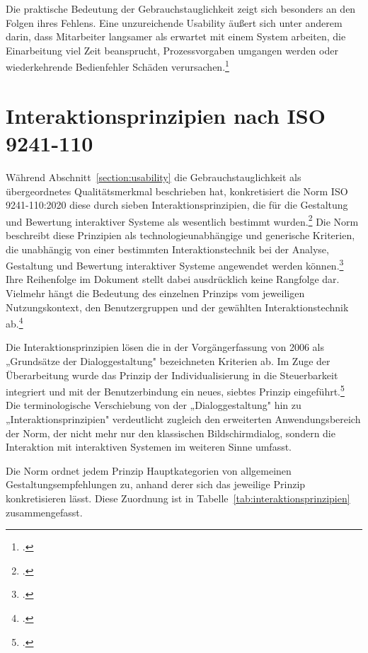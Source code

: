 Die praktische Bedeutung der Gebrauchstauglichkeit zeigt sich besonders an den Folgen ihres Fehlens. Eine unzureichende Usability äußert
sich unter anderem darin, dass Mitarbeiter langsamer als erwartet mit einem System arbeiten, die Einarbeitung viel Zeit beansprucht, 
Prozessvorgaben umgangen werden oder wiederkehrende Bedienfehler Schäden verursachen.\footcite[Vgl.][S. 7]{richter_2010}


\section{Interaktionsprinzipien nach ISO 9241-110}
\label{grundsaetzeISO}

Während Abschnitt~\ref{section:usability} die Gebrauchstauglichkeit als übergeordnetes Qualitätsmerkmal beschrieben hat, konkretisiert die 
Norm ISO 9241-110:2020 diese durch sieben Interaktionsprinzipien, die für die Gestaltung und Bewertung interaktiver Systeme als wesentlich 
bestimmt wurden.\footcite[Vgl.][Abschnitt 4.1]{DIN_ISO_9241-110:2020} Die Norm beschreibt diese Prinzipien als technologieunabhängige 
und generische Kriterien, die unabhängig von einer bestimmten Interaktionstechnik bei der Analyse, Gestaltung und Bewertung interaktiver 
Systeme angewendet werden können.\footcite[Vgl.][Einleitung]{DIN_ISO_9241-110:2020} Ihre Reihenfolge im Dokument stellt dabei ausdrücklich 
keine Rangfolge dar. Vielmehr hängt die Bedeutung des einzelnen Prinzips vom jeweiligen Nutzungskontext, den Benutzergruppen und der gewählten 
Interaktionstechnik ab.\footcite[Vgl.][Abschnitt 4.5]{DIN_ISO_9241-110:2020}

Die Interaktionsprinzipien lösen die in der Vorgängerfassung von 2006 als „Grundsätze der Dialoggestaltung" bezeichneten Kriterien ab. Im Zuge 
der Überarbeitung wurde das Prinzip der Individualisierung in die Steuerbarkeit integriert und mit der Benutzerbindung ein neues, siebtes Prinzip 
eingeführt.\footcite[Vgl.][Nationales Vorwort, Änderungen]{DIN_ISO_9241-110:2020} Die terminologische Verschiebung von der „Dialoggestaltung" hin zu 
„Interaktionsprinzipien" verdeutlicht zugleich den erweiterten Anwendungsbereich der Norm, der nicht mehr nur den klassischen Bildschirmdialog, 
sondern die Interaktion mit interaktiven Systemen im weiteren Sinne umfasst.

Die Norm ordnet jedem Prinzip Hauptkategorien von allgemeinen Gestaltungsempfehlungen zu, anhand derer sich das jeweilige Prinzip konkretisieren 
lässt. Diese Zuordnung ist in Tabelle~\ref{tab:interaktionsprinzipien} zusammengefasst.

